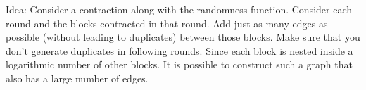 \begin{teachnote}
Idea: Consider a contraction along with the randomness function.
Consider each round and the blocks contracted in that round.
Add just as many edges as possible (without leading to duplicates)
between those blocks.  Make sure that you don't generate duplicates
in following rounds.  Since each block is nested inside a
logarithmic number of other blocks.  It is possible to construct
such a graph that also has a large number of edges.
\end{teachnote}
